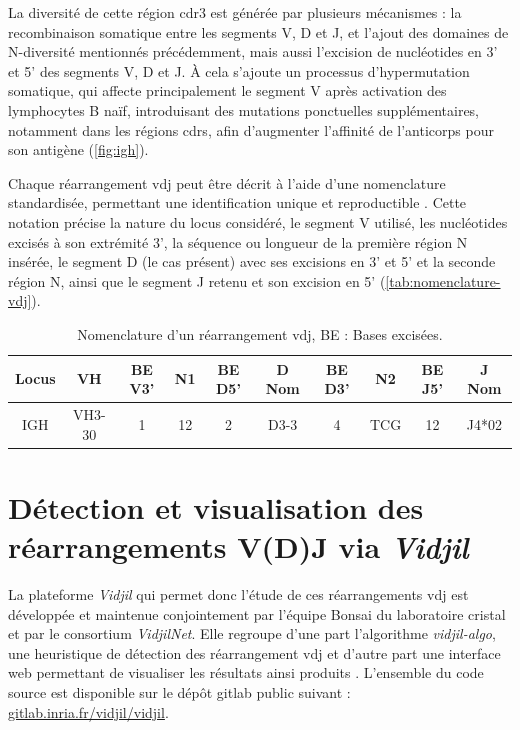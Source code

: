 La diversité de cette région \gls{cdr}3 est générée par plusieurs mécanismes :
la recombinaison somatique entre les segments V, D et J, et l'ajout des
domaines de N-diversité mentionnés précédemment, mais aussi l'excision de
nucléotides en 3' et 5' des segments V, D et J. À cela s'ajoute un processus
d'hypermutation somatique, qui affecte principalement le segment V après
activation des lymphocytes B naïf, introduisant des mutations ponctuelles
supplémentaires, notamment dans les régions \glspl{cdr}, afin d'augmenter
l'affinité de l'anticorps pour son antigène (\autoref{fig:igh}).



Chaque réarrangement \gls{vdj} peut être décrit à l'aide d'une nomenclature
standardisée, permettant une identification unique et reproductible
\cite{laneIMGTONTOLOGYIMGTLIGMotif2010,lefrancIMGT30Years2019}. Cette notation
précise la nature du locus considéré, le segment V utilisé, les nucléotides
excisés à son extrémité 3', la séquence ou longueur de la première région N
insérée, le segment D (le cas présent) avec ses excisions en 3' et 5' et la
seconde région N, ainsi que le segment J retenu et son excision en 5'
(\autoref{tab:nomenclature-vdj}).

\begin{table}[H]
    \centering
    \caption{Nomenclature d'un réarrangement \gls{vdj}, BE : Bases excisées.}
    \label{tab:nomenclature-vdj}
    \begin{tabular}{c c c c c c c c c c}
        \toprule
        \textbf{Locus} & \textbf{VH}     & \textbf{BE V3'} & \textbf{N1}     & \textbf{BE D5'} &
        \textbf{D Nom} & \textbf{BE D3'} & \textbf{N2}     & \textbf{BE J5'} & \textbf{J Nom}                                \\
        \midrule IGH   & VH3-30          & 1               & 12              & 2               & D3-3 & 4 & TCG & 12 & J4*02 \\
        \bottomrule
    \end{tabular}
\end{table}

\section{Détection et visualisation des réarrangements V(D)J via \textit{Vidjil}}

La plateforme \textit{Vidjil} qui permet donc l'étude de ces réarrangements
\gls{vdj} est développée et maintenue conjointement par l'équipe Bonsai du
laboratoire \gls{cristal} et par le consortium \textit{VidjilNet}. Elle
regroupe d'une part l'algorithme \textit{vidjil-algo}, une heuristique de
détection des réarrangement \gls{vdj}
\cite{giraudFastMulticlonalClusterization2014b} et d'autre part une interface
web permettant de visualiser les résultats ainsi produits
\cite{duezVidjilWebPlatform2016}. L'ensemble du code source est disponible sur
le dépôt gitlab public suivant :
\href{https://gitlab.inria.fr/vidjil/vidjil}{gitlab.inria.fr/vidjil/vidjil}.


